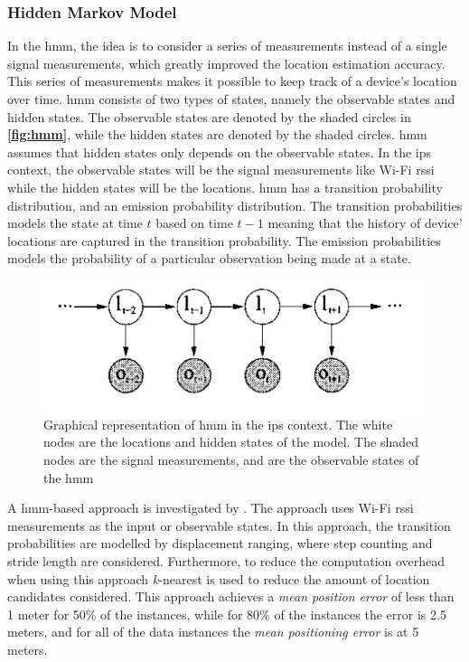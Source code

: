 \subsubsection{Hidden Markov Model}
In the \gls{hmm}, the idea is to consider a series of measurements instead of a single signal measurements, which greatly improved the location estimation accuracy. This series of measurements makes it possible to keep track of a device's location over time. \gls{hmm} consists of two types of states, namely the observable states and hidden states. The observable states are denoted by the shaded circles in \textbf{\autoref{fig:hmm}}, while the hidden states are denoted by the shaded circles. \gls{hmm} assumes that hidden states only depends on the observable states. In the \gls{ips} context, the observable states will be the signal measurements like Wi-Fi \gls{rssi} while the hidden states will be the locations. \gls{hmm} has a transition probability distribution, and an emission probability distribution. The transition probabilities models the state at time $t$ based on time $t-1$ meaning that the history of device' locations are captured in the transition probability. The emission probabilities models the probability of a particular observation being made at a state.\cite{hmmOverview}
\begin{figure}[h]
    \centering
    \includegraphics[scale=1.6]{Images/ProblemAnalysis/hmm_pe.PNG}
    \caption{Graphical representation of \gls{hmm} in the \gls{ips} context. The white nodes are the locations and hidden states of the model. The shaded nodes are the signal measurements, and are the observable states of the \gls{hmm} \cite{hmmOverview}}
    \label{fig:hmm}
\end{figure}

A \gls{hmm}-based approach is investigated by \cite{hmm01}. The approach uses Wi-Fi \gls{rssi} measurements as the input or observable states. In this approach, the transition probabilities are modelled by displacement ranging, where step counting and stride length are considered. Furthermore, to reduce the computation overhead when using this approach \textit{k}-nearest is used to reduce the amount of location candidates considered. This approach achieves a \textit{mean position error} of less than 1 meter for 50\% of the instances, while for 80\% of the instances the error is 2.5 meters, and for all of the data instances the \textit{mean positioning error} is at 5 meters.

